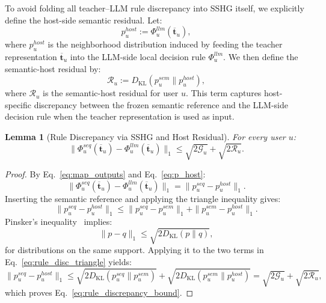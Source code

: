 ﻿\documentclass{article}
\newtheorem{lemma}{Lemma}[section]
\begin{document}
To avoid folding all teacher--LLM rule discrepancy into SSHG itself, we explicitly define the host-side semantic residual. Let:
\begin{equation}
p_u^{host}:=\Phi_u^{llm}(\overline{\mathbf{t}}_u),
\label{eq:p_host}
\end{equation}
where $p_u^{host}$ is the neighborhood distribution induced by feeding the teacher representation $\overline{\mathbf{t}}_u$ into the LLM-side local decision rule $\Phi_u^{llm}$. We then define the semantic-host residual by:
\begin{equation}
\mathcal{R}_u
:=
D_{\mathrm{KL}}(p_u^{sem}\|p_u^{host}),
\label{eq:host_residual}
\end{equation}
where $\mathcal R_u$ is the semantic-host residual for user $u$. This term captures host-specific discrepancy between the frozen semantic reference and the LLM-side decision rule when the teacher representation is used as input.

\begin{lemma}[Rule Discrepancy via SSHG and Host Residual]
\label{lem:rule_discrepancy}
For every user $u$:
\begin{equation}
\|\Phi_u^{seq}(\overline{\mathbf{t}}_u)-\Phi_u^{llm}(\overline{\mathbf{t}}_u)\|_1
\le
\sqrt{2\mathcal G_u}
+
\sqrt{2\mathcal R_u}.
\label{eq:rule_discrepancy_bound}
\end{equation}
\end{lemma}

\begin{proof}
By Eq.~\eqref{eq:map_outputs} and Eq.~\eqref{eq:p_host}:
\begin{equation}
\|\Phi_u^{seq}(\overline{\mathbf{t}}_u)-\Phi_u^{llm}(\overline{\mathbf{t}}_u)\|_1
=
\|p_u^{seq}-p_u^{host}\|_1.
\end{equation}
Inserting the semantic reference and applying the triangle inequality gives:
\begin{equation}
\|p_u^{seq}-p_u^{host}\|_1
\le
\|p_u^{seq}-p_u^{sem}\|_1
+
\|p_u^{sem}-p_u^{host}\|_1.
\label{eq:rule_disc_triangle}
\end{equation}
Pinsker's inequality~\cite{csiszar1967information,cover2006elements} implies:
\begin{equation}
\|p-q\|_1\le \sqrt{2D_{\mathrm{KL}}(p\|q)},
\end{equation}
for distributions on the same support. Applying it to the two terms in Eq.~\eqref{eq:rule_disc_triangle} yields:
\begin{equation}
\|p_u^{seq}-p_u^{host}\|_1
\le
\sqrt{2D_{\mathrm{KL}}(p_u^{seq}\|p_u^{sem})}
+
\sqrt{2D_{\mathrm{KL}}(p_u^{sem}\|p_u^{host})}
=
\sqrt{2\mathcal G_u}
+
\sqrt{2\mathcal R_u},
\end{equation}
which proves Eq.~\eqref{eq:rule_discrepancy_bound}.
\end{proof}
\end{document}
